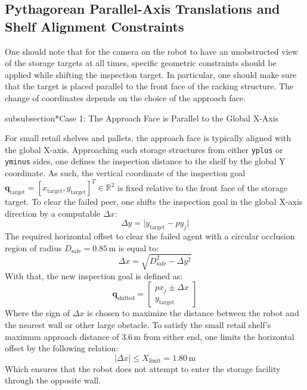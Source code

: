 \subsection{Pythagorean Parallel-Axis Translations and Shelf Alignment Constraints}

One should note that for the camera on the robot to have an unobstructed view of the storage targets at all times, specific geometric constraints should be applied while shifting the inspection target. In particular, one should make sure that the target is placed parallel to the front face of the racking structure. The change of coordinates depends on the choice of the approach face.

subsubsection*{Case 1: The Approach Face is Parallel to the Global X-Axis}

For small retail shelves and pallets, the approach face is typically aligned with the global X-axis. Approaching such storage structures from either \texttt{yplus} or \texttt{yminus} sides, one defines the inspection distance to the shelf by the global Y coordinate. As such, the vertical coordinate of the inspection goal $\mathbf{q}_{\text{target}} = [x_{\text{target}}, y_{\text{target}}]^T \in \mathbb{R}^2$ is fixed relative to the front face of the storage target. To clear the failed peer, one shifts the inspection goal in the global X-axis direction by a computable $\Delta x$:
\begin{equation} \Delta y = \lvert y_{\text{target}} - py_j \rvert \label{eq:perpendicular_y_distance} \end{equation}
The required horizontal offset to clear the failed agent with a circular occlusion region of radius $D_{\text{safe}} = 0.85\,\text{m}$ is equal to:
\begin{equation} \Delta x = \sqrt{D_{\text{safe}}^2 - \Delta y^2} \label{eq:pythagorean_x_shift} \end{equation}
With that, the new inspection goal is defined as:
\begin{equation} \mathbf{q}_{\text{shifted}} = \begin{bmatrix} px_j \pm \Delta x \\ y_{\text{target}} \end{bmatrix} \label{eq:shifted_goal_x_axis} \end{equation}
Where the sign of $\Delta x$ is chosen to maximize the distance between the robot and the nearest wall or other large obstacle. To satisfy the small retail shelf's maximum approach distance of $3.6\,\text{m}$ from either end, one limits the horizontal offset by the following relation:
\begin{equation} \lvert\Delta x\rvert \le X_{\text{limit}} = 1.80\,\text{m} \label{eq:small_shelf_shift_bound} \end{equation}
Which ensures that the robot does not attempt to enter the storage facility through the opposite wall.


